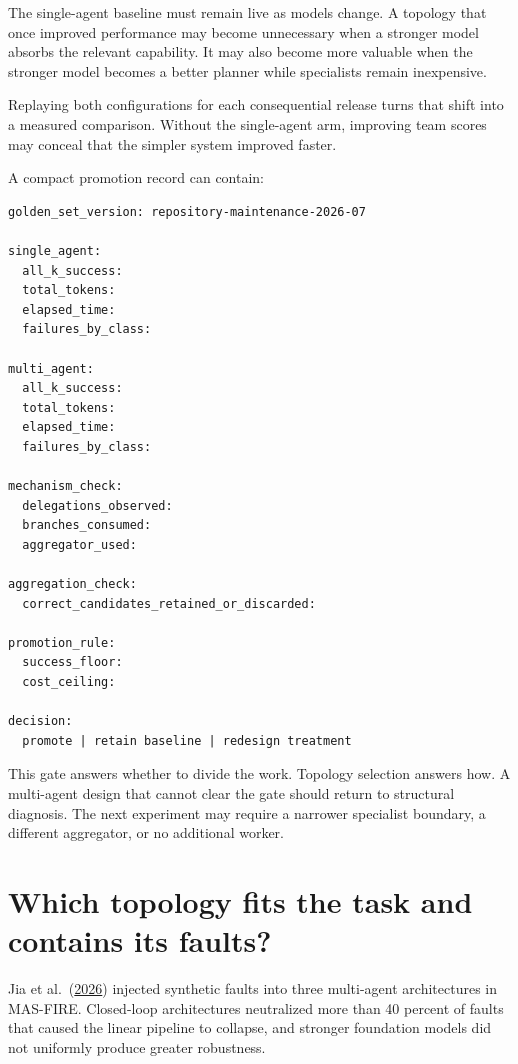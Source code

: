 The single-agent baseline must remain live as models change. A topology that once improved performance may become unnecessary when a stronger model absorbs the relevant capability. It may also become more valuable when the stronger model becomes a better planner while specialists remain inexpensive.

Replaying both configurations for each consequential release turns that shift into a measured comparison. Without the single-agent arm, improving team scores may conceal that the simpler system improved faster.

A compact promotion record can contain:

\begin{verbatim}
golden_set_version: repository-maintenance-2026-07

single_agent:
  all_k_success:
  total_tokens:
  elapsed_time:
  failures_by_class:

multi_agent:
  all_k_success:
  total_tokens:
  elapsed_time:
  failures_by_class:

mechanism_check:
  delegations_observed:
  branches_consumed:
  aggregator_used:

aggregation_check:
  correct_candidates_retained_or_discarded:

promotion_rule:
  success_floor:
  cost_ceiling:

decision:
  promote | retain baseline | redesign treatment
\end{verbatim}

This gate answers whether to divide the work. Topology selection answers how. A multi-agent design that cannot clear the gate should return to structural diagnosis. The next experiment may require a narrower specialist boundary, a different aggregator, or no additional worker.

\hypertarget{which-topology-fits-the-task-and-contains-its-faults}{%
\section{Which topology fits the task and contains its faults?}\label{which-topology-fits-the-task-and-contains-its-faults}}

Jia et al.~(\href{https://arxiv.org/abs/2602.19843}{2026}) injected synthetic faults into three multi-agent architectures in MAS-FIRE. Closed-loop architectures neutralized more than 40 percent of faults that caused the linear pipeline to collapse, and stronger foundation models did not uniformly produce greater robustness.

